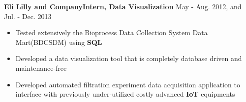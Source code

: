 \documentclass[10.5pt]{res} %
\begin{document}
\begin{resume}
    \textbf{Eli Lilly and Company}\quad\quad \textbf{Intern, Data Visualization  %
    }\hfill May - Aug. 2012, and Jul. - Dec. 2013
    \begin{itemize} pt
    	\item Tested extensively the Bioprocess Data Collection System Data Mart(BDCSDM) using \textbf{SQL} %
    	\item  Developed a data visualization tool that is completely database driven and maintenance-free %
    	\item Developed automated filtration experiment data acquisition application to interface with previously under-utilized costly advanced \textbf{IoT} equipments %

\end{itemize}
\end{resume}
\end{document}
